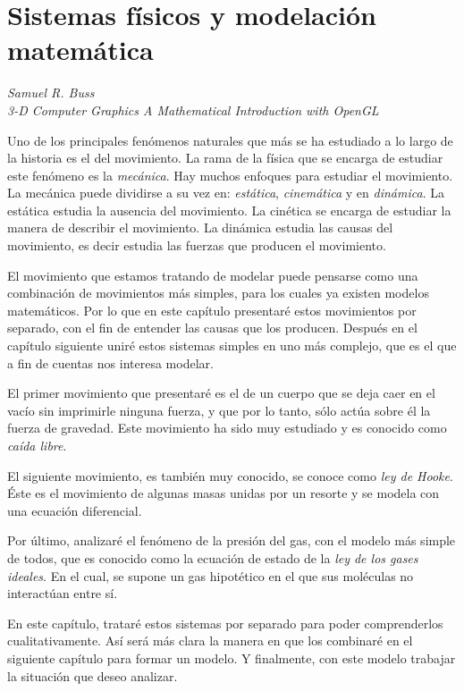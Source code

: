 \chapter{Sistemas físicos y modelación matemática}

\epigraph{}{\textit{Samuel R. Buss \\ 3-D Computer Graphics A Mathematical Introduction with OpenGL}}

Uno de los principales fenómenos naturales que más se ha estudiado a lo largo de la historia es el del movimiento.
La rama de la física que se encarga de estudiar este fenómeno es la \emph{mecánica}.
Hay muchos enfoques para estudiar el movimiento.
La mecánica puede dividirse a su vez en: \emph{estática}, \emph{cinemática} y en \emph{dinámica}.
La estática estudia la ausencia del movimiento.
La cinética se encarga de estudiar la manera de describir el movimiento.
La dinámica estudia las causas del movimiento, es decir estudia las fuerzas que producen el movimiento.

El movimiento que estamos tratando de modelar puede pensarse como una combinación de movimientos más simples, para los cuales ya existen modelos matemáticos.
Por lo que en este capítulo presentaré estos movimientos por separado, con el fin de entender las causas que los producen.
Después en el capítulo siguiente uniré estos sistemas simples en uno más complejo, que es el que a fin de cuentas nos interesa modelar.

El primer movimiento que presentaré es el de un cuerpo que se deja caer en el vacío sin imprimirle ninguna fuerza, y que por lo tanto, sólo actúa sobre él la fuerza de gravedad.
Este movimiento ha sido muy estudiado y es conocido como \emph{caída libre}. 

El siguiente movimiento, es también muy conocido, se conoce como \emph{ley de Hooke}.
Éste es el movimiento de algunas masas unidas por un resorte y se modela con una ecuación diferencial.

Por último, analizaré el fenómeno de la presión del gas, con el modelo más simple de todos, que es conocido como la ecuación de estado de la \emph{ley de los gases ideales}.
En el cual, se supone un gas hipotético en el que sus moléculas no interactúan entre sí.

En este capítulo, trataré estos sistemas por separado para poder comprenderlos cualitativamente.
Así será más clara la manera en que los combinaré en el siguiente capítulo para formar un modelo.
Y finalmente, con este modelo trabajar la situación que deseo analizar.


